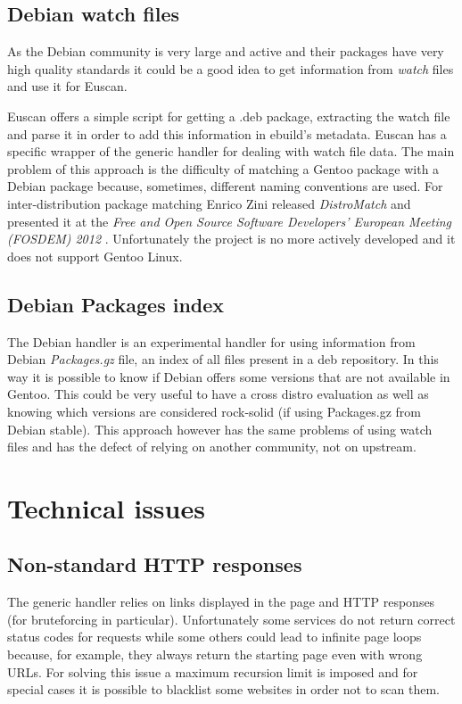 \subsection{Debian watch files}
As the Debian community is very large and active and their packages have very high quality standards it could be a good idea to get information from \emph{watch} files and use it for Euscan.

Euscan offers a simple script for getting a .deb package, extracting the watch file and parse it in order to add this information in ebuild's metadata.
Euscan has a specific wrapper of the generic handler for dealing with watch file data.
The main problem of this approach is the difficulty of matching a Gentoo package with a Debian package because, sometimes, different naming conventions are used. For inter-distribution package matching Enrico Zini released \emph{DistroMatch} \cite{distromatch} and presented it at the \emph{Free and Open Source Software Developers' European Meeting (FOSDEM) 2012} \cite{distromatch_fosdem}. Unfortunately the project is no more actively developed \cite{distromatch_away} and it does not support Gentoo Linux.


\subsection{Debian Packages index}
The Debian handler is an experimental handler for using information from Debian \emph{Packages.gz} file, an index of all files present in a deb repository. In this way it is possible to know if Debian offers some versions that are not available in Gentoo. This could be very useful to have a cross distro evaluation as well as knowing which versions are considered rock-solid (if using Packages.gz from Debian stable).
This approach however has the same problems of using watch files and has the defect of relying on another community, not on upstream.

\section{Technical issues}
\subsection{Non-standard HTTP responses}
The generic handler relies on links displayed in the page and HTTP responses (for bruteforcing in particular). Unfortunately some services do not return correct status codes for requests while some others could lead to infinite page loops because, for example, they always return the starting page even with wrong URLs.
For solving this issue a maximum recursion limit is imposed and for special cases it is possible to blacklist some websites in order not to scan them.

